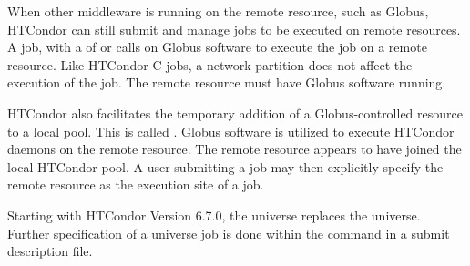 When other middleware is running on the remote resource,
such as Globus,
HTCondor can still submit and manage jobs to be executed on
remote resources.
A   job,
with a  of
 or 
calls on Globus software to execute the job on a remote resource.
Like HTCondor-C jobs, a network partition does not affect
the execution of the job.
The remote resource must have Globus software running.

HTCondor also facilitates the temporary addition of a
Globus-controlled resource to a local pool.
This is called .
Globus software is utilized to execute HTCondor daemons on the
remote resource.
The remote resource appears to have joined the local HTCondor pool.
A user submitting a job may then explicitly specify the
remote resource as the execution site of a job.

Starting with HTCondor Version 6.7.0, the  universe
replaces the  universe.
Further specification of a  universe job is done
within the  command in a submit description file.
